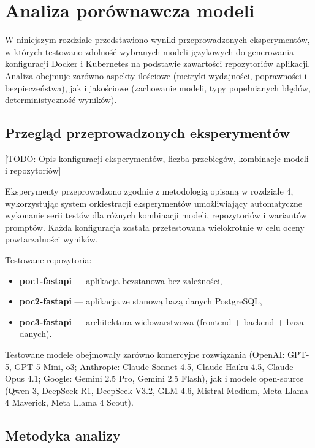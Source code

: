 \clearpage %
\section{Analiza porównawcza modeli}

W niniejszym rozdziale przedstawiono wyniki przeprowadzonych eksperymentów, w których testowano zdolność wybranych modeli językowych do generowania konfiguracji Docker i Kubernetes na podstawie zawartości repozytoriów aplikacji. Analiza obejmuje zarówno aspekty ilościowe (metryki wydajności, poprawności i bezpieczeństwa), jak i jakościowe (zachowanie modeli, typy popełnianych błędów, deterministyczność wyników).

\subsection{Przegląd przeprowadzonych eksperymentów}

[TODO: Opis konfiguracji eksperymentów, liczba przebiegów, kombinacje modeli i repozytoriów]

Eksperymenty przeprowadzono zgodnie z metodologią opisaną w rozdziale 4, wykorzystując system orkiestracji eksperymentów umożliwiający automatyczne wykonanie serii testów dla różnych kombinacji modeli, repozytoriów i wariantów promptów. Każda konfiguracja została przetestowana wielokrotnie w celu oceny powtarzalności wyników.

Testowane repozytoria:
\begin{itemize}
    \item \textbf{poc1-fastapi} — aplikacja bezstanowa bez zależności,
    \item \textbf{poc2-fastapi} — aplikacja ze stanową bazą danych PostgreSQL,
    \item \textbf{poc3-fastapi} — architektura wielowarstwowa (frontend + backend + baza danych).
\end{itemize}

Testowane modele obejmowały zarówno komercyjne rozwiązania (OpenAI: GPT-5, GPT-5 Mini, o3; Anthropic: Claude Sonnet 4.5, Claude Haiku 4.5, Claude Opus 4.1; Google: Gemini 2.5 Pro, Gemini 2.5 Flash), jak i modele open-source (Qwen 3, DeepSeek R1, DeepSeek V3.2, GLM 4.6, Mistral Medium, Meta Llama 4 Maverick, Meta Llama 4 Scout).

\subsection{Metodyka analizy}

